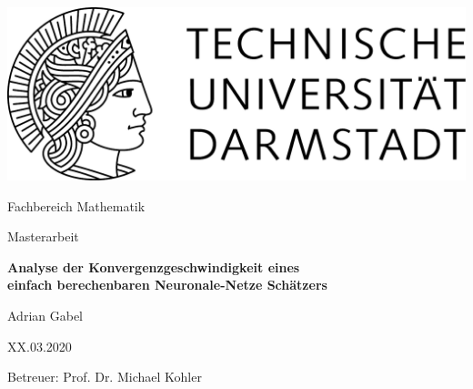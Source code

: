 \begin{titlepage}
  \begin{center}
    \vspace{1cm}
    \includegraphics[width=0.5\linewidth]{TU_Darmstadt_Logo.pdf}
    \vspace{1cm}
    
    \large{Fachbereich Mathematik}
    \vspace{2.5cm}
    
    \large{Masterarbeit}
    \vspace{2cm}

    \Large{\textbf{Analyse der Konvergenzgeschwindigkeit eines \\ einfach berechenbaren Neuronale-Netze Schätzers}}
    
    \vspace*{3cm}    
    
		\large
                Adrian Gabel
    \vspace*{1.0cm}

    XX.03.2020 \\
    \vspace*{2cm}

    Betreuer: Prof. Dr. Michael Kohler

    \vspace*{.5cm}

    \vspace*{\fill}
  \end{center}
\end{titlepage}
\vspace*{\fill}
